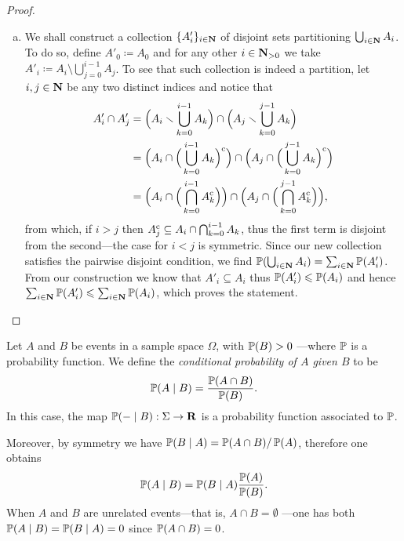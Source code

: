 \begin{proof}
\begin{enumerate}[(a)]
\item We shall construct a collection \(\{A'_{i}\}_{i \in \mathbf{N}}\) of disjoint sets
  partitioning \(\bigcup_{i \in \mathbf{N}} A_i\). To do so, define
  \(A'_{0} \coloneq A_{0}\) and for any other \(i \in \mathbf{N}_{> 0}\) we take
  \(A'_i \coloneq A_i \setminus \bigcup_{j = 0}^{i-1} A_j\). To see that such collection is indeed a
  partition, let \(i, j \in \mathbf{N}\) be any two distinct indices and notice that
  \begin{align*}
    A_i' \cap A_j'
    &= \Big( A_i \smallsetminus \bigcup_{k=0}^{i-1} A_k \Big)
    \cap \Big( A_j \smallsetminus \bigcup_{k=0}^{j-1} A_k \Big) \\
    &= \Big( A_i \cap \Big(\bigcup_{k=0}^{i-1} A_k\Big)^{\text{c}} \Big)
      \cap \Big( A_j \cap \Big(\bigcup_{k=0}^{j-1} A_k\Big)^{\text{c}} \Big) \\
    &= \Big( A_i \cap \Big(\bigcap_{k=0}^{i-1} {A}^{\text{c}}_k\Big) \Big)
      \cap \Big( A_j \cap \Big(\bigcap_{k=0}^{j-1} {A}^{\text{c}}_k\Big) \Big),
  \end{align*}
  from which, if \(i > j\) then
  \({A}^{\text{c}}_j \subseteq A_i \cap \bigcap_{k=0}^{i-1} A_k\), thus the first term
  is disjoint from the second---the case for \(i < j\) is symmetric. Since our
  new collection satisfies the pairwise disjoint condition, we find
  \(\operatorname{\mathbb{P}}(\bigcup_{i \in \mathbf{N}} A_i) = \sum_{i \in \mathbf{N}} \operatorname{\mathbb{P}}(A'_i)\). From our
  construction we know that \(A'_i \subseteq A_i\) thus \(\operatorname{\mathbb{P}}(A'_i) \leqslant
  \operatorname{\mathbb{P}}(A_i)\) and hence \(\sum_{i \in \mathbf{N}} \operatorname{\mathbb{P}}(A_i') \leqslant \sum_{i \in \mathbf{N}}
  \operatorname{\mathbb{P}}(A_i)\), which proves the statement.
\end{enumerate}
\end{proof}

\begin{definition}
\label{def:conditional-probability}
Let \(A\) and \(B\) be events in a sample space \(\Omega\), with
\(\operatorname{\mathbb{P}}(B) > 0\) ---where \(\operatorname{\mathbb{P}}\) is a probability function. We define the
\emph{conditional probability of \(A\) given \(B\)} to be
\[
\operatorname{\mathbb{P}}(A \mid B) = \frac{\operatorname{\mathbb{P}}(A \cap B)}{\operatorname{\mathbb{P}}(B)}.
\]
In this case, the map \(\operatorname{\mathbb{P}}(- \mid B): \Sigma \to \mathbf{R}\) is a probability
function associated to \(\operatorname{\mathbb{P}}\).
\end{definition}

Moreover, by symmetry we have \(\operatorname{\mathbb{P}}(B \mid A) = \operatorname{\mathbb{P}}(A \cap B)/\operatorname{\mathbb{P}}(A)\),
therefore one obtains
\[
\operatorname{\mathbb{P}}(A \mid B) = \operatorname{\mathbb{P}}(B \mid A) \frac{\operatorname{\mathbb{P}}(A)}{\operatorname{\mathbb{P}}(B)}.
\]
When \(A\) and \(B\) are unrelated events---that is, \(A \cap B = \emptyset\)
---one has both \(\operatorname{\mathbb{P}}(A \mid B) = \operatorname{\mathbb{P}}(B \mid A) = 0\) since
\(\operatorname{\mathbb{P}}(A \cap B) = 0\).

